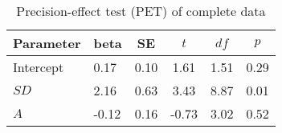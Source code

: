 \begin{table}[ht]
\centering
\caption{Precision-effect test (PET) of complete data} 
\label{tab:PET}
\begingroup\small
\begin{tabular}{llcccc}
  \hline
Parameter & beta & SE & $t$ & $df$ & $p$ \\ 
  \hline
Intercept & 0.17 & 0.10 & 1.61 & 1.51 & 0.29 \\ 
  $SD$ & 2.16 & 0.63 & 3.43 & 8.87 & 0.01 \\ 
  $A$ & -0.12 & 0.16 & -0.73 & 3.02 & 0.52 \\ 
   \hline
\end{tabular}
\endgroup
\end{table}

